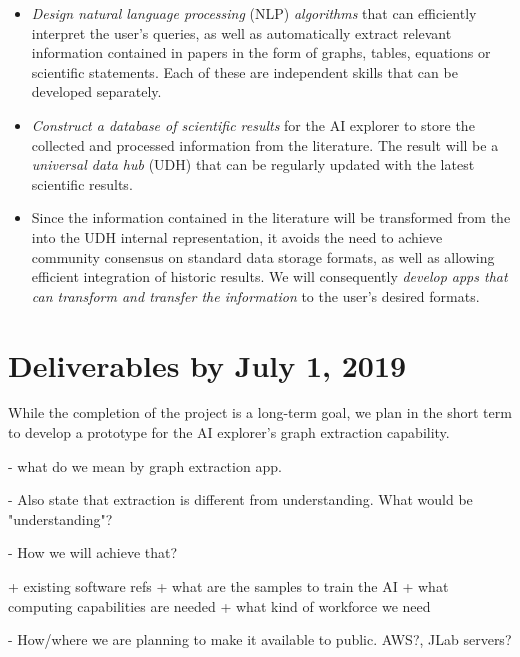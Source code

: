 \documentclass{article}[12pt,preprint]
\begin{document}
\begin{itemize}

\item
{\it Design natural language processing} (NLP) {\it algorithms} that
can efficiently interpret the user's queries, as well as automatically
extract relevant information contained in papers in the form of graphs,
tables, equations or scientific statements.  Each of these are
independent skills that can be developed separately.

\item
{\it Construct a database of scientific results} for the AI explorer
to store the collected and processed information from the literature.
The result will be a \emph{universal data hub} (UDH) that can be
regularly updated with the latest scientific results.

\item 
Since the information contained in the literature will be transformed
from the into the UDH internal representation, it avoids the need to
achieve community consensus on standard data storage formats, as well as
allowing efficient integration of historic results.
We will consequently {\it develop apps that can transform and transfer
the information} to the user's desired formats.

\end{itemize}

\section{Deliverables by July 1, 2019}

While the completion of the project is a long-term goal, we plan in the
short term to develop a prototype for the AI explorer's graph extraction capability. 

{\color{red}

- what do we mean by graph extraction app.

- Also state that extraction is different from understanding. 
  What would be "understanding"?  

- How we will achieve that? 
 
  + existing software refs 
  + what are the samples to train the AI
  + what computing capabilities are needed
  + what kind of workforce we need

- How/where we are planning to make it available to public. AWS?, JLab
  servers? 

}
\end{document}
